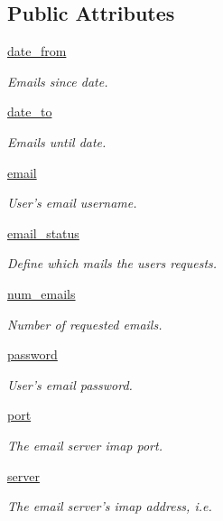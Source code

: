 \subsection*{Public Attributes}
\begin{DoxyCompactItemize}
\item 
\hyperlink{classRappCloud_1_1CloudMsgs_1_1EmailFetch_1_1EmailFetch_1_1Request_a2e5c0120bb2bb330e9f3506b477865a9}{date\-\_\-from}
\begin{DoxyCompactList}\small\item\em Emails since date. \end{DoxyCompactList}\item 
\hyperlink{classRappCloud_1_1CloudMsgs_1_1EmailFetch_1_1EmailFetch_1_1Request_ab8cbfb113421da0d7a9d42cbb896cc81}{date\-\_\-to}
\begin{DoxyCompactList}\small\item\em Emails until date. \end{DoxyCompactList}\item 
\hyperlink{classRappCloud_1_1CloudMsgs_1_1EmailFetch_1_1EmailFetch_1_1Request_ac5899d360316acf4fdd7531ffd6e91e4}{email}
\begin{DoxyCompactList}\small\item\em User's email username. \end{DoxyCompactList}\item 
\hyperlink{classRappCloud_1_1CloudMsgs_1_1EmailFetch_1_1EmailFetch_1_1Request_a1b1a7543a71977d2388ed62dc98abf64}{email\-\_\-status}
\begin{DoxyCompactList}\small\item\em Define which mails the users requests. \end{DoxyCompactList}\item 
\hyperlink{classRappCloud_1_1CloudMsgs_1_1EmailFetch_1_1EmailFetch_1_1Request_af5cc8347f1223b107c4be3f1c98718ad}{num\-\_\-emails}
\begin{DoxyCompactList}\small\item\em Number of requested emails. \end{DoxyCompactList}\item 
\hyperlink{classRappCloud_1_1CloudMsgs_1_1EmailFetch_1_1EmailFetch_1_1Request_a08bce5b96f45195daadc488ebe126894}{password}
\begin{DoxyCompactList}\small\item\em User's email password. \end{DoxyCompactList}\item 
\hyperlink{classRappCloud_1_1CloudMsgs_1_1EmailFetch_1_1EmailFetch_1_1Request_a02b001ea07a0f2887a916a74fcedb5a4}{port}
\begin{DoxyCompactList}\small\item\em The email server imap port. \end{DoxyCompactList}\item 
\hyperlink{classRappCloud_1_1CloudMsgs_1_1EmailFetch_1_1EmailFetch_1_1Request_a388ba1968b842e1d8b26000320e5f7bc}{server}
\begin{DoxyCompactList}\small\item\em The email server's imap address, i.\-e. \end{DoxyCompactList}\end{DoxyCompactItemize}


